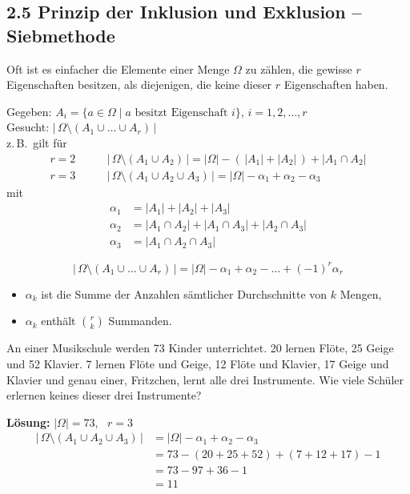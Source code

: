 \subsection{2.5 Prinzip der Inklusion und Exklusion -- Siebmethode}

Oft ist es einfacher die Elemente einer Menge $\Omega$ zu zählen, die gewisse $r$ Eigenschaften besitzen, als diejenigen, die keine dieser $r$ Eigenschaften haben.

Gegeben: \quad $A_i = \{ a \in \Omega \mid a \text{ besitzt Eigenschaft } i \}$, \quad $i = 1, 2, \dots, r$\\
Gesucht: \quad $|\,\Omega \setminus (A_1 \cup \dots \cup A_r)\,|$\\
z.\,B.\ gilt für
\begin{align*}
r = 2 &\qquad |\,\Omega \setminus (A_1 \cup A_2)\,| = |\Omega| - (\,|A_1| + |A_2|\,) + |A_1 \cap A_2| \\
r = 3 &\qquad |\,\Omega \setminus (A_1 \cup A_2 \cup A_3)\,| = |\Omega| - \alpha_1 + \alpha_2 - \alpha_3
\end{align*}
mit
\begin{align*}
\alpha_1 &= |A_1| + |A_2| + |A_3| \\
\alpha_2 &= |A_1 \cap A_2| + |A_1 \cap A_3| + |A_2 \cap A_3| \\
\alpha_3 &= |A_1 \cap A_2 \cap A_3|
\end{align*}

\begin{satz}[Allgemein]
\[
|\,\Omega \setminus (A_1 \cup \dots \cup A_r)\,| = |\Omega| - \alpha_1 + \alpha_2 - \dots + (-1)^r \alpha_r
\]
\begin{itemize}
\item[-] $\alpha_k$ ist die Summe der Anzahlen sämtlicher Durchschnitte von $k$ Mengen,
\item[-] $\alpha_k$ enthält $\binom{r}{k}$ Summanden.
\end{itemize}
\end{satz}

\begin{beispiel}
An einer Musikschule werden 73 Kinder unterrichtet.
20 lernen Flöte, 25 Geige und 52 Klavier.
7 lernen Flöte und Geige, 12 Flöte und Klavier, 17 Geige und Klavier
und genau einer, Fritzchen, lernt alle drei Instrumente.
Wie viele Schüler erlernen keines dieser drei Instrumente?

\textbf{Lösung:} \quad $|\Omega| = 73$, \ $r = 3$
\begin{align*}
|\,\Omega \setminus (A_1 \cup A_2 \cup A_3)\,| &= |\Omega| - \alpha_1 + \alpha_2 - \alpha_3 \\
&= 73 - (20 + 25 + 52) + (7 + 12 + 17) - 1 \\
&= 73 - 97 + 36 - 1 \\
&= 11
\end{align*}
\end{beispiel}

